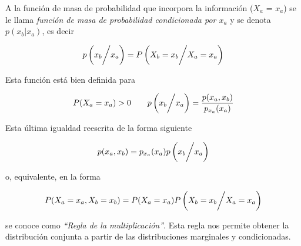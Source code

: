 \documentclass{article}
\begin{document}
A la función de masa de probabilidad que incorpora la información ($X_a$ = $x_a$) se le llama \textit{función de masa de probabilidad condicionada por $x_a$}
y se denota $p(x_b|x_a)$, es decir 

\[ p\left( {x_b} \bigg{/} {x_a} \right) = P\left( {X_{b} = x_{b}} \bigg{/} {X_{a} = x_{a}} \right) \]

\newpage

Esta función está bien definida para 

\[ P(X_{a} = x_{a}) > 0 \qquad p\left(x_b \bigg{/} x_a\right) = \frac{p(x_a, x_b)}{p_{x_{a}}(x_a)} \]

Esta última igualdad reescrita de la forma siguiente

\[ p(x_a, x_b) =  p_{x_a}(x_a)p\left( x_b \bigg{/} x_a \right)\]

o, equivalente, en la forma

\[ P(X_a = x_a, X_b = x_b) = P(X_a = x_a)P\left( X_b = x_b \bigg{/} X_a = x_a \right) \]

se conoce como \textit{``Regla de la multiplicación''}. Esta regla nos permite obtener la distribución conjunta
a partir de las distribuciones marginales y condicionadas.
\end{document}
